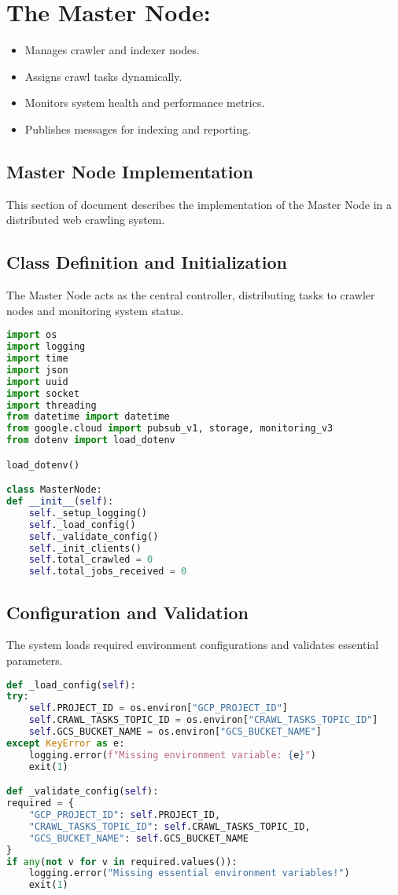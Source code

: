 \documentclass[12pt,a4paper]{report}
\begin{document}
\section{The Master Node:}
\begin{itemize}
\item Manages crawler and indexer nodes.
\item Assigns crawl tasks dynamically.
\item Monitors system health and performance metrics.
\item Publishes messages for indexing and reporting.
\end{itemize}

\subsection{Master Node Implementation}
This section of document describes the implementation of the Master Node in a distributed web crawling system. 
\subsection{Class Definition and Initialization}
The Master Node acts as the central controller, distributing tasks to crawler nodes and monitoring system status.
\begin{lstlisting}[language=Python]
import os
import logging
import time
import json
import uuid
import socket
import threading
from datetime import datetime
from google.cloud import pubsub_v1, storage, monitoring_v3
from dotenv import load_dotenv

load_dotenv()

class MasterNode:
def __init__(self):
    self._setup_logging()
    self._load_config()
    self._validate_config()
    self._init_clients()
    self.total_crawled = 0
    self.total_jobs_received = 0
\end{lstlisting}
\newpage
\subsection{Configuration and Validation}
The system loads required environment configurations and validates essential parameters.
\begin{lstlisting}[language=Python]
def _load_config(self):
try:
    self.PROJECT_ID = os.environ["GCP_PROJECT_ID"]
    self.CRAWL_TASKS_TOPIC_ID = os.environ["CRAWL_TASKS_TOPIC_ID"]
    self.GCS_BUCKET_NAME = os.environ["GCS_BUCKET_NAME"]
except KeyError as e:
    logging.error(f"Missing environment variable: {e}")
    exit(1)

def _validate_config(self):
required = {
    "GCP_PROJECT_ID": self.PROJECT_ID,
    "CRAWL_TASKS_TOPIC_ID": self.CRAWL_TASKS_TOPIC_ID,
    "GCS_BUCKET_NAME": self.GCS_BUCKET_NAME
}
if any(not v for v in required.values()):
    logging.error("Missing essential environment variables!")
    exit(1)
\end{lstlisting}
\end{document}
